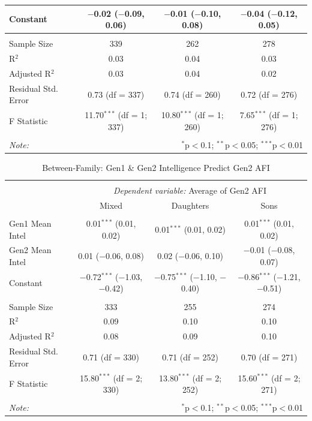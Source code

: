 \documentclass[a4paper,man,apacite,natbib,12pt,longtable]{apa6}\usepackage[]{graphicx}\usepackage[]{color}
\begin{document}
\begin{landscape}
\begin{longtable}{@{\extracolsep{5pt}}lccc}
  Constant & $-$0.02 ($-$0.09, 0.06) & $-$0.01 ($-$0.10, 0.08) & $-$0.04 ($-$0.12, 0.05) \\ 
 \hline \\[-1.8ex] 
Sample Size & 339 & 262 & 278 \\ 
R$^{2}$ & 0.03 & 0.04 & 0.03 \\ 
Adjusted R$^{2}$ & 0.03 & 0.04 & 0.02 \\ 
Residual Std. Error & 0.73 (df = 337) & 0.74 (df = 260) & 0.72 (df = 276) \\ 
F Statistic & 11.70$^{***}$ (df = 1; 337) & 10.80$^{***}$ (df = 1; 260) & 7.65$^{***}$ (df = 1; 276) \\ 
\hline 
\hline \\[-1.8ex] 
\textit{Note:}  & \multicolumn{3}{r}{$^{*}$p$<$0.1; $^{**}$p$<$0.05; $^{***}$p$<$0.01} \\ 
  \end{longtable}\pagebreak
  \begin{longtable}{@{\extracolsep{5pt}}lccc} 
  \caption{Between-Family: Gen1 \& Gen2 Intelligence Predict Gen2 AFI} \label{table_Mean_Joint_Intelligence_Mean_Child_AFI_11}
  \\[-1.8ex]\hline 
  \hline \\[-3.8ex] 
  & \multicolumn{3}{c}{\textit{Dependent variable:} Average of Gen2 AFI} \\ 
  \cline{2-4}
   & Mixed & Daughters & Sons \\ 
\hline \\[-1.8ex] 
 Gen1 Mean Intel & 0.01$^{***}$ (0.01, 0.02) & 0.01$^{***}$ (0.01, 0.02) & 0.01$^{***}$ (0.01, 0.02) \\ 
  Gen2 Mean Intel & 0.01 ($-$0.06, 0.08) & 0.02 ($-$0.06, 0.10) & $-$0.01 ($-$0.08, 0.07) \\ 
  Constant & $-$0.72$^{***}$ ($-$1.03, $-$0.42) & $-$0.75$^{***}$ ($-$1.10, $-$0.40) & $-$0.86$^{***}$ ($-$1.21, $-$0.51) \\ 
 \hline \\[-1.8ex] 
Sample Size & 333 & 255 & 274 \\ 
R$^{2}$ & 0.09 & 0.10 & 0.10 \\ 
Adjusted R$^{2}$ & 0.08 & 0.09 & 0.10 \\ 
Residual Std. Error & 0.71 (df = 330) & 0.71 (df = 252) & 0.70 (df = 271) \\ 
F Statistic & 15.80$^{***}$ (df = 2; 330) & 13.80$^{***}$ (df = 2; 252) & 15.60$^{***}$ (df = 2; 271) \\ 
\hline 
\hline \\[-1.8ex] 
\textit{Note:}  & \multicolumn{3}{r}{$^{*}$p$<$0.1; $^{**}$p$<$0.05; $^{***}$p$<$0.01} \\ 
  \end{longtable}\pagebreak

\end{landscape}
\end{document}
